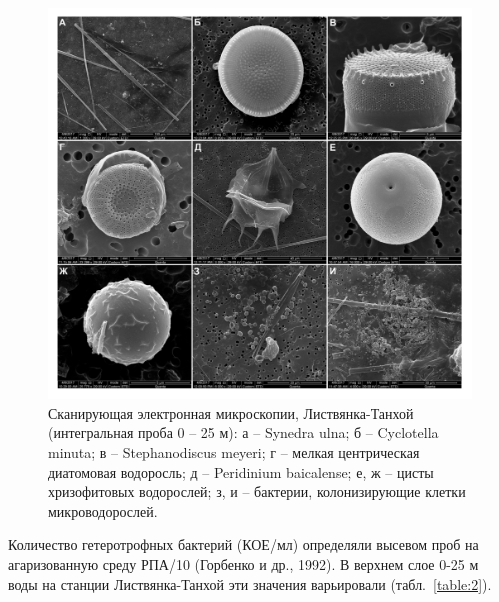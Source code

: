 \documentclass[a4paper,12pt,openany,final]{extreport}
\def\oldcaption{} \let\oldcaption=\caption
\def\caption{\stepcounter{captionsnum}\oldcaption}
\begin{document}
\begin{figure}\centering
\includegraphics[width=\linewidth]{media/image3.jpeg}

\caption{Сканирующая электронная микроскопии, Листвянка-Танхой
(интегральная проба 0 -- 25 м): а -- Synedra ulna; б -- Cyclotella
minuta; в -- Stephanodiscus meyeri; г -- мелкая центрическая диатомовая
водоросль; д -- Peridinium baicalense; е, ж -- цисты хризофитовых
водорослей; з, и -- бактерии, колонизирующие клетки микроводорослей.}\label{fig:micro}
\end{figure}

Количество гетеротрофных бактерий (КОЕ/мл) определяли высевом проб на
агаризованную среду РПА/10 (Горбенко и др., 1992). В верхнем слое 0-25 м воды
на станции Листвянка-Танхой эти значения варьировали (табл.~\ref{table:2}).
\end{document}
